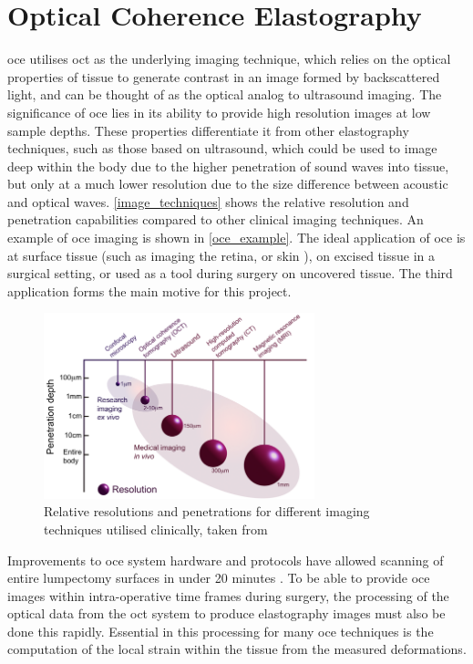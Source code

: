 \section{Optical Coherence Elastography}\label{solution}
\ac{oce} utilises \ac{oct} as the underlying imaging technique, which relies on the optical properties of tissue to generate contrast in an image formed by backscattered light, and can be thought of as the optical analog to ultrasound imaging. The significance of \ac{oce} lies in its ability to provide high resolution images at low sample depths. These properties differentiate it from other elastography techniques, such as those based on ultrasound, which could be used to image deep within the body due to the higher penetration of sound waves into tissue, but only at a much lower resolution due to the size difference between acoustic and optical waves. \autoref{image_techniques} shows the relative resolution and penetration capabilities compared to other clinical imaging techniques. An example of \ac{oce} imaging is shown in \autoref{oce_example}. The ideal application of \ac{oce} is at surface tissue (such as imaging the retina, or skin \cite{kennedy_review_2014}), on excised tissue in a surgical setting, or used as a tool during surgery on uncovered tissue. The third application forms the main motive for this project.

\begin{figure}[t]
	\centering
    	\includegraphics[width=0.7\textwidth]{bground_figs/technique_comparison.png}
    	\caption{Relative resolutions and penetrations for different imaging techniques utilised clinically, taken from \cite{optical+biomedical_engineering_laboratory_introduction_nodate}}
    	\label{image_techniques}	
\end{figure}

Improvements to \ac{oce} system hardware and protocols have allowed scanning of entire lumpectomy surfaces in under 20 minutes \cite{allen_wide-field_2016}. To be able to provide \ac{oce} images within intra-operative time frames during surgery, the processing of the optical data from the \ac{oct} system to produce elastography images must also be done this rapidly. Essential in this processing for many \ac{oce} techniques is the computation of the local strain within the tissue from the measured deformations. 

